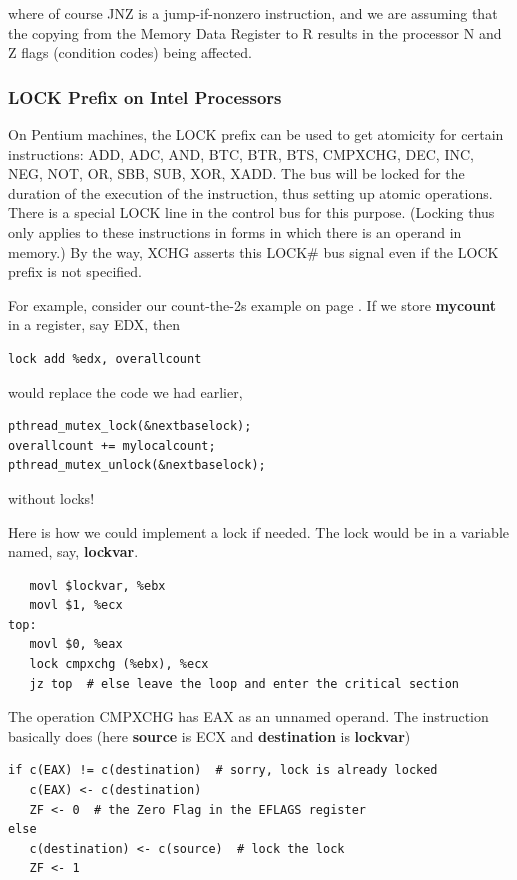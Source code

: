 where of course JNZ is a jump-if-nonzero instruction, and we are
assuming that the copying from the Memory Data Register to R results in
the processor N and Z flags (condition codes) being affected.

\subsubsection{LOCK Prefix on Intel Processors}
\label{lockprefix}


On Pentium machines, the LOCK prefix can be used to get atomicity for
certain instructions:  ADD, ADC, AND, BTC, BTR, BTS, CMPXCHG, DEC, INC,
NEG, NOT, OR, SBB, SUB, XOR, XADD.  The bus will be locked for the
duration of the execution of the instruction, thus setting up atomic
operations.  There is a special LOCK line in the control bus for this
purpose.  (Locking thus only applies to these instructions in forms in
which there is an operand in memory.) By the way, XCHG asserts this
LOCK\# bus signal even if the LOCK prefix is not specified.

For example, consider our count-the-2s example on  page
\pageref{count2s}.  If we store {\bf mycount} in a register, say EDX,
then

\begin{lstlisting}
lock add %edx, overallcount
\end{lstlisting}

would replace the code we had earlier,

\begin{lstlisting}
pthread_mutex_lock(&nextbaselock);
overallcount += mylocalcount;
pthread_mutex_unlock(&nextbaselock);
\end{lstlisting}

without locks!

Here is how we could implement a lock if needed.  The lock would be in a
variable named, say, {\bf lockvar}.

\begin{lstlisting}
   movl $lockvar, %ebx
   movl $1, %ecx
top:
   movl $0, %eax
   lock cmpxchg (%ebx), %ecx
   jz top  # else leave the loop and enter the critical section
\end{lstlisting}

The operation CMPXCHG has EAX as an unnamed operand.  The instruction
basically does (here {\bf source} is ECX and {\bf destination} is {\bf
lockvar})

\begin{lstlisting}
if c(EAX) != c(destination)  # sorry, lock is already locked
   c(EAX) <- c(destination)
   ZF <- 0  # the Zero Flag in the EFLAGS register
else
   c(destination) <- c(source)  # lock the lock
   ZF <- 1
\end{lstlisting}

